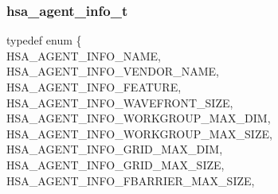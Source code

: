 \documentclass[final,oneside]{book}
\newcommand{\reftyp}[1]{#1}
\newcommand{\refenu}[1]{\reftyp{#1}}
\newenvironment{mylongtable}{\rowcolors{0}{lightgray}{lightgray}\longtable} {
\endlongtable}
\begin{document}
\subsubsection{hsa_\-agent_\-info_\-t}
\vspace{-5.5mm}\begin{mylongtable}{@{}p{\textwidth}}
\rule{0pt}{3ex}typedef enum \{\\\hspace{1.7em}\hypertarget{group__agentinfo_1gga39d0684207d95717d96319573b3e4a42a06b3ca6080e3bfd4d5b07db91d766e4c}{\refenu{HSA_\-AGENT_\-INFO_\-NAME}},\\
\hspace{1.7em}\hypertarget{group__agentinfo_1gga39d0684207d95717d96319573b3e4a42ac9e0c3d4f881d6de12ff8792eb92292c}{\refenu{HSA_\-AGENT_\-INFO_\-VENDOR_\-NAME}},\\
\hspace{1.7em}\hypertarget{group__agentinfo_1gga39d0684207d95717d96319573b3e4a42a4ce35a53f20e53b76c7cc7697f08ea04}{\refenu{HSA_\-AGENT_\-INFO_\-FEATURE}},\\
\hspace{1.7em}\hypertarget{group__agentinfo_1gga39d0684207d95717d96319573b3e4a42a2474a5a57ecbf494156769f408ded8fd}{\refenu{HSA_\-AGENT_\-INFO_\-WAVEFRONT_\-SIZE}},\\
\hspace{1.7em}\hypertarget{group__agentinfo_1gga39d0684207d95717d96319573b3e4a42a595eea133327c6c6110c02a0661a06d6}{\refenu{HSA_\-AGENT_\-INFO_\-WORKGROUP_\-MAX_\-DIM}},\\
\hspace{1.7em}\hypertarget{group__agentinfo_1gga39d0684207d95717d96319573b3e4a42ade0ccd571bdc023d644d2337621e91f6}{\refenu{HSA_\-AGENT_\-INFO_\-WORKGROUP_\-MAX_\-SIZE}},\\
\hspace{1.7em}\hypertarget{group__agentinfo_1gga39d0684207d95717d96319573b3e4a42a512597f1fd2c2e6baee29f364ccd924f}{\refenu{HSA_\-AGENT_\-INFO_\-GRID_\-MAX_\-DIM}},\\
\hspace{1.7em}\hypertarget{group__agentinfo_1gga39d0684207d95717d96319573b3e4a42a16cd0e9d2e75ee3db1c22738b2cad8f6}{\refenu{HSA_\-AGENT_\-INFO_\-GRID_\-MAX_\-SIZE}},\\
\hspace{1.7em}\hypertarget{group__agentinfo_1gga39d0684207d95717d96319573b3e4a42a81f9780e49dd38b4f836289fd3647bad}{\refenu{HSA_\-AGENT_\-INFO_\-FBARRIER_\-MAX_\-SIZE}},\\

\end{mylongtable}
\end{document}
